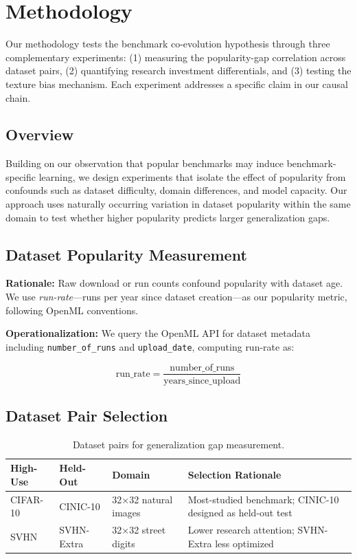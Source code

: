 \section{Methodology}

Our methodology tests the benchmark co-evolution hypothesis through three complementary experiments: (1) measuring the popularity-gap correlation across dataset pairs, (2) quantifying research investment differentials, and (3) testing the texture bias mechanism. Each experiment addresses a specific claim in our causal chain.

\subsection{Overview}

Building on our observation that popular benchmarks may induce benchmark-specific learning, we design experiments that isolate the effect of popularity from confounds such as dataset difficulty, domain differences, and model capacity. Our approach uses naturally occurring variation in dataset popularity within the same domain to test whether higher popularity predicts larger generalization gaps.

\subsection{Dataset Popularity Measurement}

\textbf{Rationale:} Raw download or run counts confound popularity with dataset age. We use \emph{run-rate}---runs per year since dataset creation---as our popularity metric, following OpenML conventions.

\textbf{Operationalization:} We query the OpenML API for dataset metadata including \texttt{number\_of\_runs} and \texttt{upload\_date}, computing run-rate as:

\begin{equation}
\text{run\_rate} = \frac{\text{number\_of\_runs}}{\text{years\_since\_upload}}
\end{equation}

\subsection{Dataset Pair Selection}

\begin{table}[h]
\centering
\caption{Dataset pairs for generalization gap measurement.}
\label{tab:dataset-pairs}
\begin{tabular}{@{}llll@{}}
\toprule
High-Use & Held-Out & Domain & Selection Rationale \\
\midrule
CIFAR-10 & CINIC-10 & 32$\times$32 natural images & Most-studied benchmark; CINIC-10 designed as held-out test \\
SVHN & SVHN-Extra & 32$\times$32 street digits & Lower research attention; SVHN-Extra less optimized \\
\bottomrule
\end{tabular}
\end{table}

